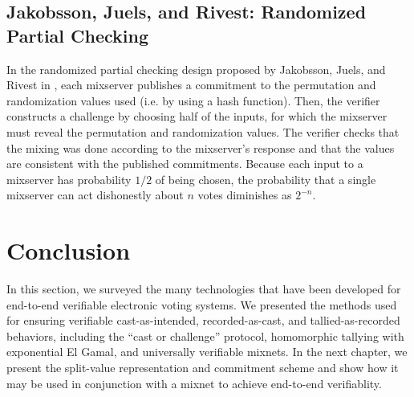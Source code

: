 \subsection{Jakobsson, Juels, and Rivest: Randomized Partial Checking}

In the randomized partial checking design proposed by Jakobsson, Juels, and Rivest in \cite{jjr02}, each mixserver publishes a commitment to the permutation and randomization values used (i.e. by using a hash function). Then, the verifier constructs a challenge by choosing half of the inputs, for which the mixserver must reveal the permutation and randomization values. The verifier checks that the mixing was done according to the mixserver's response and that the values are consistent with the published commitments. Because each input to a mixserver has probability $1/2$ of being chosen, the probability that a single mixserver can act dishonestly about $n$ votes diminishes as $2^{-n}$.

\section{Conclusion} \label{evote:conclusion}

In this section, we surveyed the many technologies that have been developed for end-to-end verifiable electronic voting systems. We presented the methods used for ensuring verifiable cast-as-intended, recorded-as-cast, and tallied-as-recorded behaviors, including the ``cast or challenge'' protocol, homomorphic tallying with exponential El Gamal, and universally verifiable mixnets. In the next chapter, we present the split-value representation and commitment scheme and show how it may be used in conjunction with a mixnet to achieve end-to-end verifiablity.






